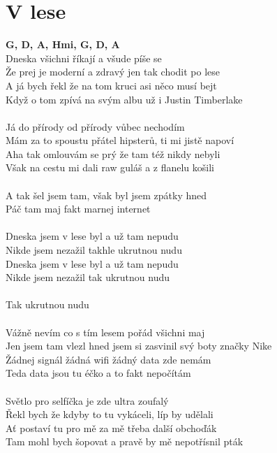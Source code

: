 \section{V lese}
\footnotesize\textbf{G, D, A, Hmi, G, D, A}\\
\normalsize
{}Dneska všichni říkají a všude píše se\\
Že prej je moderní a zdravý jen tak chodit po lese\\
A já bych řekl že na tom kruci asi něco musí bejt\\
Když o tom zpívá na svým albu už i Justin Timberlake\\
\\
Já do přírody od přírody vůbec nechodím\\
Mám za to spoustu přátel hipsterů, ti mi jistě napoví\\
Aha tak omlouvám se prý že tam též nikdy nebyli\\
Však na cestu mi dali raw guláš a z flanelu košili\\
\\
A tak šel jsem tam, však byl jsem zpátky hned\\
Páč tam maj fakt marnej internet\\
\\
Dneska jsem v lese byl a už tam nepudu\\
Nikde jsem nezažil takhle ukrutnou nudu\\
Dneska jsem v lese byl a už tam nepudu\\
Nikde jsem nezažil tak ukrutnou nudu\\
\\
Tak ukrutnou nudu\\
\\
Vážně nevím co s tím lesem pořád všichni maj\\
Jen jsem tam vlezl hned jsem si zasvinil svý boty značky Nike\\
Žádnej signál žádná wifi žádný data zde nemám\\
Teda data jsou tu éčko a to fakt nepočítám\\
\\
Světlo pro selfíčka je zde ultra zoufalý\\
Řekl bych že kdyby to tu vykáceli, líp by udělali\\
Ať postaví tu pro mě za mě třeba další obchoďák\\
Tam mohl bych šopovat a pravě by mě nepotřísnil pták\\
\\
